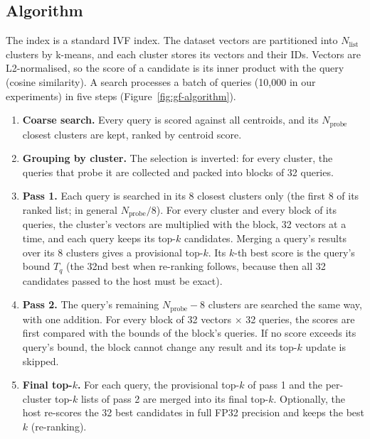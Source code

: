\subsection{Algorithm}
\label{sec:gf-algorithm}

The index is a standard IVF index. The dataset vectors are partitioned into
\(N_{\mathrm{list}}\) clusters by k-means, and each cluster stores its vectors and
their IDs. Vectors are L2-normalised, so the score of a candidate is its inner
product with the query (cosine similarity). A search processes a batch of queries
(10{,}000 in our experiments) in five steps (Figure~\ref{fig:gf-algorithm}).

\begin{enumerate}
  \item \textbf{Coarse search.} Every query is scored against all centroids, and
    its \(N_{\mathrm{probe}}\) closest clusters are kept, ranked by centroid score.
  \item \textbf{Grouping by cluster.} The selection is inverted: for every
    cluster, the queries that probe it are collected and packed into blocks of
    32 queries.
  \item \textbf{Pass 1.} Each query is searched in its 8 closest clusters only
    (the first 8 of its ranked list; in general \(N_{\mathrm{probe}}/8\)). For
    every cluster and every block of its queries, the cluster's vectors are
    multiplied with the block, 32 vectors at a time, and each query keeps its
    top-\(k\) candidates. Merging a query's results over its 8 clusters gives a
    provisional top-\(k\). Its \(k\)-th best score is the query's bound \(T_q\)
    (the 32nd best when re-ranking follows, because then all 32 candidates
    passed to the host must be exact).
  \item \textbf{Pass 2.} The query's remaining \(N_{\mathrm{probe}}-8\) clusters
    are searched the same way, with one addition. For every block of 32 vectors
    \(\times\) 32 queries, the scores are first compared with the bounds of the
    block's queries. If no score exceeds its query's bound, the block cannot
    change any result and its top-\(k\) update is skipped.
  \item \textbf{Final top-\(k\).} For each query, the provisional top-\(k\) of pass 1
    and the per-cluster top-\(k\) lists of pass 2 are merged into its final
    top-\(k\). Optionally, the host re-scores the 32 best candidates in full FP32
    precision and keeps the best \(k\) (re-ranking).
\end{enumerate}

